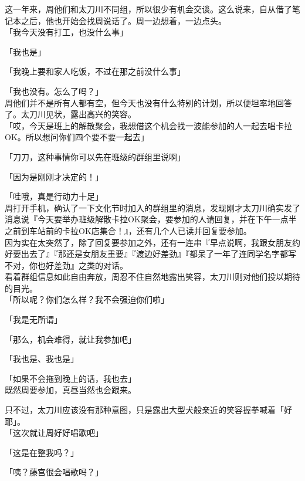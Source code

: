 这一年来，周他们和太刀川不同组，所以很少有机会交谈。这么说来，自从借了笔记本之后，他也开始会找周说话了。周一边想着，一边点头。\\

「我今天没有打工，也没什么事」

「我也是」

「我晚上要和家人吃饭，不过在那之前没什么事」

「我也没有。怎么了吗？」\\

周他们并不是所有人都有空，但今天也没有什么特别的计划，所以便坦率地回答了。太刀川见状，露出高兴的笑容。\\

「哎，今天是班上的解散聚会，我想借这个机会找一波能参加的人一起去唱卡拉OK。所以想问你们四个要不要一起去」

「刀刀，这种事情你可以先在班级的群组里说啊」

「因为是刚刚才决定的！」

「哇哦，真是行动力十足」\\

周打开手机，确认了一下文化节时加入的群组里的消息，发现刚才太刀川确实发了消息说『今天要举办班级解散卡拉OK聚会，要参加的人请回复，并在下午一点半之前到车站前的卡拉OK店集合！』，还有几个人已读并回复要参加。\\

因为实在太突然了，除了回复要参加之外，还有一连串『早点说啊，我跟女朋友约好要出去了』『那还是女朋友重要』『渡边好差劲』『都呆了一年了连同学名字都写不对，你也好差劲』之类的对话。\\

看着群组信息如此自由奔放，周忍不住自然地露出笑容，太刀川则对他们投以期待的目光。\\

「所以呢？你们怎么样？我不会强迫你们啦」

「我是无所谓」

「那么，机会难得，就让我参加吧」

「我也是、我也是」

「如果不会拖到晚上的话，我也去」\\

既然周要参加，真昼当然也会跟来。

只不过，太刀川应该没有那种意图，只是露出大型犬般亲近的笑容握拳喊着「好耶」。\\

「这次就让周好好唱歌吧」

「这是在整我吗？」

「咦？藤宫很会唱歌吗？」

